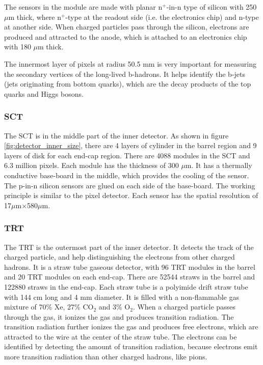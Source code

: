 The sensors in the module are made with planar n$^{+}$-in-n type of silicon with 250 $\mu$m thick, where n$^{+}$-type at the readout side (i.e. the electronics chip) and n-type at another side.
When charged particles pass through the silicon, electrons are produced and attracted to the anode, which is attached to an electronics chip with 180 $\mu$m thick.

The innermost layer of pixels at radius 50.5 mm is very important for measuring the secondary vertices of the long-lived b-hadrons.
It helps identify the b-jets (jets originating from bottom quarks), which are the decay products of the top quarks and Higgs bosons.

\subsubsection{SCT}
The SCT is in the middle part of the inner detector.
As shown in figure \ref{fig:detector_inner_size}, there are 4 layers of cylinder in the barrel region and 9 layers of disk for each end-cap region.
There are 4088 modules in the SCT and 6.3 million pixels.
Each module has the thickness of 300 $\mu$m.
It has a thermally conductive base-board in the middle, which provides the cooling of the sensor.
The p-in-n silicon sensors are glued on each side of the base-board.
The working principle is similar to the pixel detector.
Each sensor has the spatial resolution of 17$\mu$m$\times$580$\mu$m.

\subsubsection{TRT}
The TRT is the outermost part of the inner detector.
It detects the track of the charged particle, and help distinguishing the electrons from other charged hadrons.
It is a straw tube gaseous detector, with 96 TRT modules in the barrel and 20 TRT modules on each end-cap.
There are 52544 straws in the barrel and 122880 straws in the end-cap.
Each straw tube is a polyimide drift straw tube with 144 cm long and 4 mm diameter.
It is filled with a non-flammable gas mixture of 70\% Xe, 27\% CO$_2$ and 3\% O$_2$.
When a charged particle passes through the gas, it ionizes the gas and produces transition radiation.
The transition radiation further ionizes the gas and produces free electrons, which are attracted to the wire at the center of the straw tube.
The electrons can be identified by detecting the amount of transition radiation, because electrons emit more transition radiation than other charged hadrons, like pions.

